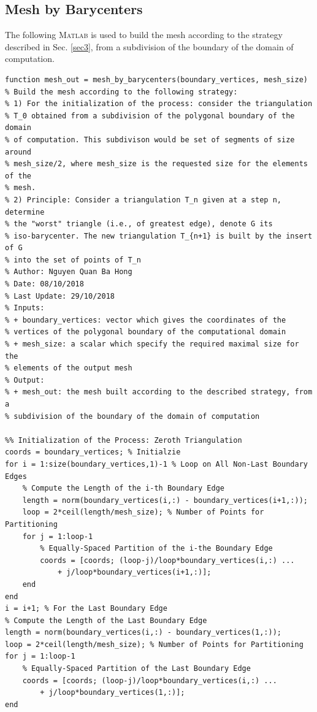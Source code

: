 \documentclass[11pt,a4paper,center,notitlepage]{article}
\numberwithin{equation}{section}
\begin{document}
\subsection{Mesh by Barycenters}\label{sec5.7}
The following \textsc{Matlab} is used to build the mesh according to the strategy described in Sec. \ref{sec3}, from a subdivision of the boundary of the domain of computation.
\begin{verbatim}
function mesh_out = mesh_by_barycenters(boundary_vertices, mesh_size)
% Build the mesh according to the following strategy:
% 1) For the initialization of the process: consider the triangulation
% T_0 obtained from a subdivision of the polygonal boundary of the domain
% of computation. This subdivison would be set of segments of size around
% mesh_size/2, where mesh_size is the requested size for the elements of the
% mesh.
% 2) Principle: Consider a triangulation T_n given at a step n, determine
% the "worst" triangle (i.e., of greatest edge), denote G its
% iso-barycenter. The new triangulation T_{n+1} is built by the insert of G
% into the set of points of T_n
% Author: Nguyen Quan Ba Hong
% Date: 08/10/2018
% Last Update: 29/10/2018
% Inputs:
% + boundary_vertices: vector which gives the coordinates of the
% vertices of the polygonal boundary of the computational domain
% + mesh_size: a scalar which specify the required maximal size for the
% elements of the output mesh
% Output:
% + mesh_out: the mesh built according to the described strategy, from a
% subdivision of the boundary of the domain of computation

%% Initialization of the Process: Zeroth Triangulation
coords = boundary_vertices; % Initialzie
for i = 1:size(boundary_vertices,1)-1 % Loop on All Non-Last Boundary Edges
    % Compute the Length of the i-th Boundary Edge
    length = norm(boundary_vertices(i,:) - boundary_vertices(i+1,:));
    loop = 2*ceil(length/mesh_size); % Number of Points for Partitioning
    for j = 1:loop-1
        % Equally-Spaced Partition of the i-the Boundary Edge
        coords = [coords; (loop-j)/loop*boundary_vertices(i,:) ...
            + j/loop*boundary_vertices(i+1,:)];
    end
end
i = i+1; % For the Last Boundary Edge
% Compute the Length of the Last Boundary Edge
length = norm(boundary_vertices(i,:) - boundary_vertices(1,:));
loop = 2*ceil(length/mesh_size); % Number of Points for Partitioning
for j = 1:loop-1
    % Equally-Spaced Partition of the Last Boundary Edge
    coords = [coords; (loop-j)/loop*boundary_vertices(i,:) ...
        + j/loop*boundary_vertices(1,:)];
end


\end{verbatim}
\end{document}
